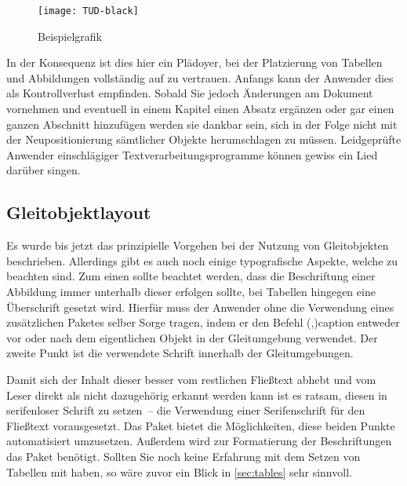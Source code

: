 \documentclass[%
  english,ngerman,%
  cdgeometry=no,DIV=12,%
  cd=false,cdfont=false,cdtitle=true,%
  headings=normal,%
  automark,%
  listof=toc,%
]{tudscrartcl}
\begin{document}
\begin{Trunk}
\begin{figure}
\centering
\texttt{[image: TUD-black]}
\caption{Beispielgrafik\label{fig:example}}
\end{figure}

\end{Trunk}
\InputCode\noindent
%
In der Konsequenz ist dies hier ein Plädoyer, bei der Platzierung von Tabellen 
und Abbildungen vollständig auf  zu vertrauen. Anfangs kann 
der Anwender dies als Kontrollverlust empfinden. Sobald Sie jedoch Änderungen 
am Dokument vornehmen und eventuell in einem Kapitel einen Absatz ergänzen oder 
gar einen ganzen Abschnitt hinzufügen werden sie dankbar sein, sich in der 
Folge nicht mit der Neupositionierung sämtlicher Objekte herumschlagen zu 
müssen. Leidgeprüfte Anwender einschlägiger Textverarbeitungsprogramme können 
gewiss ein Lied darüber singen.



\subsection{%
  Gleitobjektlayout%
  \label{sec:floatlayout}%
}

Es wurde bis jetzt das prinzipielle Vorgehen bei der Nutzung von Gleitobjekten 
beschrieben. Allerdings gibt es auch noch einige typografische Aspekte, welche 
zu beachten sind. Zum einen sollte beachtet werden, dass die Beschriftung einer 
Abbildung immer unterhalb dieser erfolgen sollte, bei Tabellen hingegen eine 
Überschrift gesetzt wird. Hierfür muss der Anwender ohne die Verwendung eines 
zusätzlichen Paketes selber Sorge tragen, indem er den Befehl 
\Macro(,){caption} entweder vor oder 
nach dem eigentlichen Objekt in der Gleitumgebung verwendet. Der zweite Punkt 
ist die verwendete Schrift innerhalb der Gleitumgebungen. 

Damit sich der Inhalt dieser besser vom restlichen Fließtext abhebt und vom 
Leser direkt als nicht dazugehörig erkannt werden kann ist es ratsam, diesen in 
serifenloser Schrift zu setzen~-- die Verwendung einer Serifenschrift für den 
Fließtext vorausgesetzt. Das Paket  bietet die Möglichkeiten, 
diese beiden Punkte automatisiert umzusetzen. Außerdem wird zur Formatierung 
der Beschriftungen das Paket  benötigt. Sollten Sie noch keine 
Erfahrung mit dem Setzen von Tabellen mit  haben, so wäre 
zuvor ein Blick in \autoref{sec:tables} sehr sinnvoll. 
\end{document}
